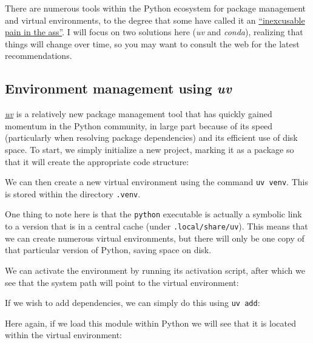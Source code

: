 There are numerous tools within the Python ecosystem for package management and virtual environments, to the degree that some have called it an \href{https://dublog.net/blog/so-many-python-package-managers/}{``inexcusable pain in the ass''}.
I will focus on two solutions here (\textit{uv} and \textit{conda}), realizing that things will change over time, so you may want to consult the web for the latest recommendations.

\subsection{Environment management using \textit{uv}}

\textit{\href{https://docs.astral.sh/uv/}{uv}} is a relatively new package management tool that has quickly gained momentum in the Python community, in large part because of its speed (particularly when resolving package dependencies) and its efficient use of disk space.
To start, we simply initialize a new project, marking it as a package so that it will create the appropriate code structure:



We can then create a new virtual environment using the command \texttt{uv venv}.
This is stored within the directory \texttt{.venv}.



One thing to note here is that the \texttt{python} executable is actually a symbolic link to a version that is in a central cache (under \texttt{.local/share/uv}).
This means that we can create numerous virtual environments, but there will only be one copy of that particular version of Python, saving space on disk.

We can activate the environment by running its activation script, after which we see that the system path will point to the virtual environment:




If we wish to add dependencies, we can simply do this using \texttt{uv add}:



Here again, if we load this module within Python we will see that it is located within the virtual environment:

